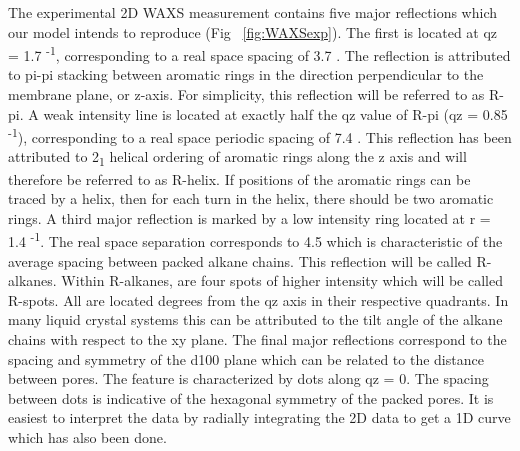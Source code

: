 The experimental 2D WAXS measurement contains five major reflections which
our model intends to reproduce (Fig ~\ref{fig:WAXSexp}). The first is located
at qz = 1.7 \angstrom \textsuperscript{-1}, corresponding to a real space 
spacing of 3.7 \angstrom. The reflection is attributed to pi-pi stacking
between aromatic rings in the direction perpendicular to the membrane plane, or z-axis. 
For simplicity, this reflection will be referred to as R-pi. A weak intensity
line is located at exactly half the qz value of R-pi (qz = 0.85 \angstrom 
\textsuperscript{-1}), corresponding to a real space periodic spacing of 
7.4 \angstroms. This reflection has been attributed to 2\textsubscript{1}
helical ordering of aromatic rings along the z axis and will therefore be
referred to as R-helix. If positions of the aromatic rings can be traced
by a helix, then for each turn in the helix, there should be two aromatic 
rings. A third major reflection is marked by a low intensity ring located
at r = 1.4 \angstrom \textsuperscript{-1}. The real space separation 
corresponds to 4.5 \angstroms which is characteristic of the average spacing
between packed alkane chains. This reflection will be called R-alkanes. 
Within R-alkanes, are four spots of higher intensity which will be called
R-spots. All are located  degrees from the qz axis
in their respective quadrants. In many liquid crystal systems this can be
attributed to the tilt angle of the alkane chains with respect to the xy plane. 
The final major reflections correspond to the spacing and symmetry of the d100 
plane which can be related to the distance between pores. The feature is
characterized by dots along qz = 0. The spacing between dots is indicative
of the hexagonal symmetry of the packed pores. It is easiest to interpret 
the data by radially integrating the 2D data to get a 1D curve which has
also been done.

